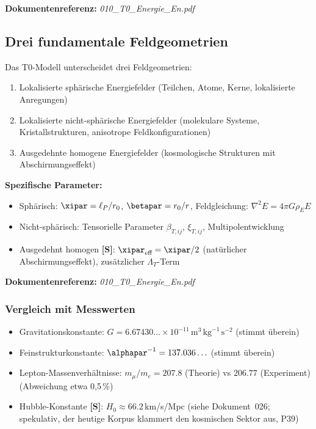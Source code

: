 \textbf{Dokumentenreferenz:} \textit{010\_T0\_Energie\_En.pdf}

\subsection{Drei fundamentale Feldgeometrien}

Das T0-Modell unterscheidet drei Feldgeometrien:

\begin{enumerate}
	\item Lokalisierte sphärische Energiefelder (Teilchen, Atome, Kerne, lokalisierte Anregungen)
	\item Lokalisierte nicht-sphärische Energiefelder (molekulare Systeme, Kristallstrukturen, anisotrope Feldkonfigurationen)
	\item Ausgedehnte homogene Energiefelder (kosmologische Strukturen mit Abschirmungseffekt)
\end{enumerate}

\textbf{Spezifische Parameter:}
\begin{itemize}
	\item Sphärisch: $\xipar = \ell_P/r_0$, $\betapar = r_0/r$, Feldgleichung: $\nabla^2 E = 4\pi G \rho_E E$
	\item Nicht-sphärisch: Tensorielle Parameter $\beta_{T,ij}$, $\xi_{T,ij}$, Multipolentwicklung
	\item Ausgedehnt homogen \textbf{[S]}: $\xipar_{\text{eff}} = \xipar/2$ (natürlicher Abschirmungseffekt), zusätzlicher $\Lambda_T$-Term
\end{itemize}

\textbf{Dokumentenreferenz:} \textit{010\_T0\_Energie\_En.pdf}

\subsubsection{Vergleich mit Messwerten}

\begin{itemize}
	\item Gravitationskonstante: $G = 6.67430\ldots \times 10^{-11} \, \text{m}^3 \, \text{kg}^{-1} \, \text{s}^{-2}$ (stimmt überein)
	\item Feinstrukturkonstante: $\alphapar^{-1} = 137.036\ldots$ (stimmt überein)
	\item Lepton-Massenverhältnisse: $m_\mu/m_e = 207.8$ (Theorie) vs $206.77$ (Experiment) (Abweichung etwa 0{,}5\,\%)
	\item Hubble-Konstante \textbf{[S]}: $H_0 \approx 66.2\,$km/s/Mpc (siehe Dokument~026; spekulativ, der heutige Korpus klammert den kosmischen Sektor aus, P39)
\end{itemize}

